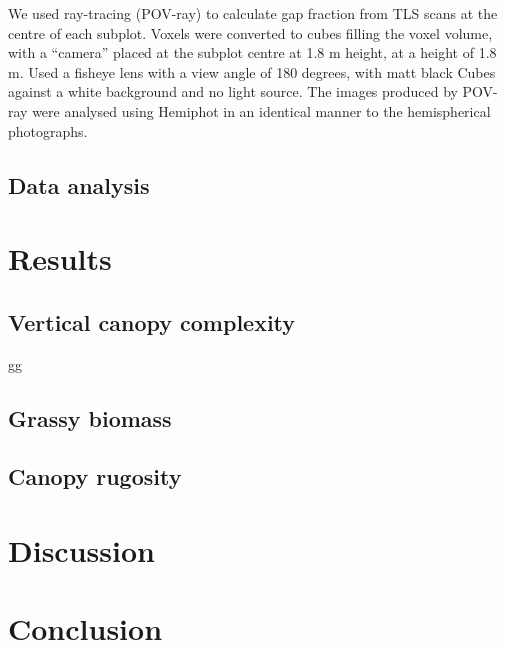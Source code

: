 \documentclass[11pt,a4paper]{article}
\newcommand{\beginsupplement}{%
	\setcounter{table}{0}
	\renewcommand{\thetable}{S\arabic{table}}%
	\setcounter{figure}{0}
	\renewcommand{\thefigure}{S\arabic{figure}}%
}
\begin{document}
We used ray-tracing (POV-ray) to calculate gap fraction from TLS scans at the centre of each subplot. Voxels were converted to cubes filling the voxel volume, with a ``camera'' placed at the subplot centre at 1.8 m height, at a height of 1.8 m. Used a fisheye lens with a view angle of 180 degrees, with matt black Cubes against a white background and no light source. The images produced by POV-ray were analysed using Hemiphot in an identical manner to the hemispherical photographs.

\subsection{Data analysis}


\section{Results}

\subsection{Vertical canopy complexity}

gg

\subsection{Grassy biomass}

\subsection{Canopy rugosity}


\section{Discussion}



\section{Conclusion}

\printbibliography

\end{document}
